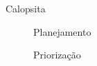 \documentclass[serif,mathserif,final]{beamer}
\begin{document}
\begin{frame}{}
\begin{columns}[t]
\begin{column}{0.29\linewidth}
\begin{block}{Calopsita}
		\begin{figure}[htb]
		  \centering
				\caption{Planejamento}
        \end{figure}
				
				\begin{figure}[htb]
         \centering
				\caption{Priorização}
        \end{figure}
      \end{block}

    \end{column} %

    \begin{column}{0.70\linewidth}

	  \begin{columns}[t] %

		\begin{column}{0.14\linewidth}

		\end{column}%

		\begin{column}{0.16\linewidth}


\end{column}
\end{columns}
\end{column}
\end{columns}
\end{frame}
\end{document}

